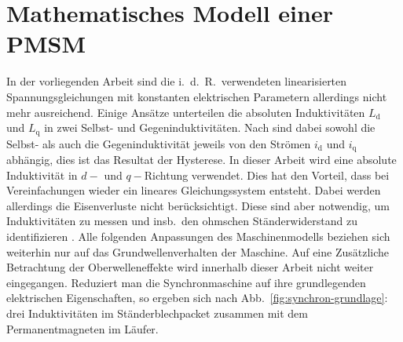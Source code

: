 \documentclass[conference,twocolumn]{IEEEtran}
\newcommand{\x}[1]{\mathrm{#1}}
\begin{document}
\section{Mathematisches Modell einer PMSM}\label{sec:math-pmsm}
In der vorliegenden Arbeit sind die i.\ d.\ R.\ verwendeten linearisierten Spannungsgleichungen mit konstanten elektrischen Parametern allerdings nicht mehr ausreichend.
Einige Ansätze unterteilen die absoluten Induktivitäten $L_\x{d}$ und $L_\x{q}$ in zwei Selbst- und Gegeninduktivitäten.
Nach \textcite{stumberger_evaluation_2003} sind dabei sowohl die Selbst- als auch die Gegeninduktivität jeweils von den Strömen $i_\x{d}$ und $i_\x{q}$ abhängig, dies ist das Resultat der Hysterese.
In dieser Arbeit wird eine absolute Induktivität in $d-$ und $q-$Richtung verwendet.
Dies hat den Vorteil, dass bei Vereinfachungen wieder ein lineares Gleichungssystem entsteht.
Dabei werden allerdings die Eisenverluste nicht berücksichtigt.
Diese sind aber notwendig, um Induktivitäten zu messen und insb.\ den ohmschen Ständerwiderstand zu identifizieren \autocite{Kellner2012}.
Alle folgenden Anpassungen des Maschinenmodells beziehen sich weiterhin nur auf das Grundwellenverhalten der Maschine.
Auf eine Zusätzliche Betrachtung der Oberwelleneffekte wird innerhalb dieser Arbeit nicht weiter eingegangen.
Reduziert man die Synchronmaschine auf ihre grundlegenden elektrischen Eigenschaften, so ergeben sich nach Abb.~\ref{fig:synchron-grundlage}: drei Induktivitäten im Ständerblechpacket zusammen mit dem Permanentmagneten im Läufer.
\end{document}
